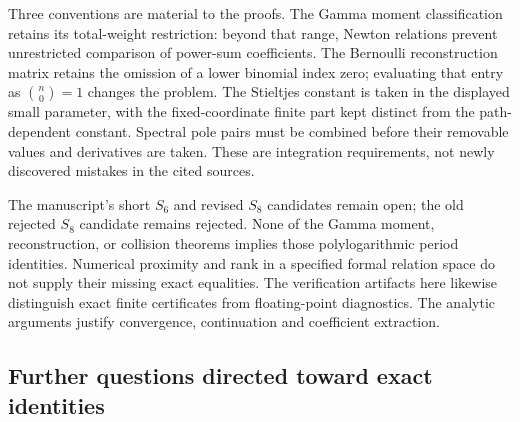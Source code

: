 Three conventions are material to the proofs. The Gamma moment
classification retains its total-weight restriction: beyond that range,
Newton relations prevent unrestricted comparison of power-sum
coefficients. The Bernoulli reconstruction matrix retains the omission
of a lower binomial index zero; evaluating that entry as
$\binom n0=1$ changes the problem. The Stieltjes constant is taken in
the displayed small parameter, with the fixed-coordinate finite part
kept distinct from the path-dependent constant. Spectral pole pairs
must be combined before their removable values and derivatives are
taken. These are integration requirements, not newly discovered
mistakes in the cited sources.

The manuscript's short $S_6$ and revised $S_8$ candidates remain open;
the old rejected $S_8$ candidate remains rejected. None of the Gamma
moment, reconstruction, or collision theorems implies those polylogarithmic
period identities. Numerical proximity and rank in a specified formal
relation space do not supply their missing exact equalities.
The verification artifacts here likewise distinguish exact finite
certificates from floating-point diagnostics. The analytic arguments
justify convergence, continuation and coefficient extraction.

\subsection{Further questions directed toward exact identities}

